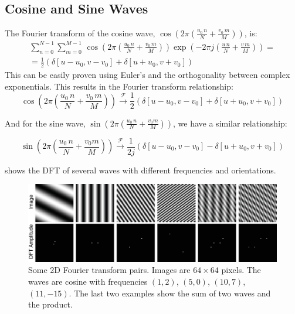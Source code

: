 \subsection{Cosine and Sine Waves}

The Fourier transform of the cosine wave, $\cos{ \left( 2\pi \left( \frac{u_0\, n}{N} + \frac{v_0\, m}{M} \right) \right) }$, is:
\begin{eqnarray}
	\sum_{n=0}^{N-1} \sum_{m=0}^{M-1} \, \cos{ \left( 2\pi \left( \frac{u_0 \, n}{N} + \frac{v_0 \, m}{M} \right) \right) }
	\exp{ \left( -2\pi j \left( \frac{u\, n}{N} + \frac{v\, m}{M} \right) \right)} = \\
	=\frac{1}{2} \left( \delta \left[u-u_0, v-v_0 \right] +  \delta \left[u+u_0, v+v_0 \right] \right)
\end{eqnarray}
This can be easily proven using Euler's \eqn{\ref{eq:euler}} and the orthogonality between complex exponentials. This results in the Fourier transform relationship:
\begin{equation}
	\cos{ \left( 2\pi \left( \frac{u_0\, n}{N} + \frac{v_0\, m}{M} \right) \right) }
	\xrightarrow{\mathscr{F}}
	\frac{1}{2} \left( \delta \left[u-u_0, v-v_0 \right] +  \delta \left[u+u_0, v+v_0 \right] \right)
\end{equation}

And for the sine wave, $\sin{ \left( 2\pi \left( \frac{u_0\, n}{N} + \frac{v_0 m}{M} \right) \right) }$, we have a  similar relationship:


\begin{equation}
	\sin{ \left( 2\pi \left( \frac{u_0\, n}{N} + \frac{v_0 m}{M} \right) \right) }
	\xrightarrow{\mathscr{F}}
	\frac{1}{2j} \left( \delta \left[u-u_0, v-v_0 \right] - \delta \left[u+u_0, v+v_0 \right]\right)
\end{equation}

\Fig{\ref{fig:2ddftexampleswaves}} shows the DFT of several waves with different frequencies and orientations.


\begin{figure}[t]
	\centerline{
		\includegraphics[width=1\linewidth]{figures/Image_processing_fourier/DFT_examples_waves.eps}
	}
	\caption{Some 2D Fourier transform pairs. Images are $64 \times 64$ pixels. The waves are cosine with frequencies $(1,2)$, $(5,0)$, $(10,7)$, $(11,-15)$. The last two examples show the sum of two waves and the product.
	}
	\label{fig:2ddftexampleswaves}
\end{figure}


